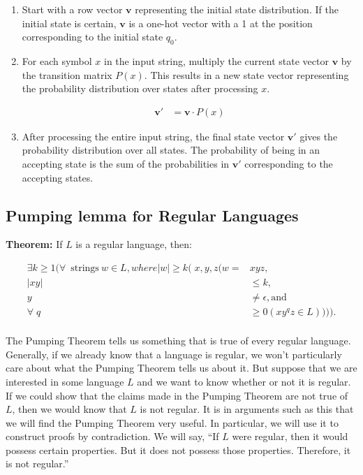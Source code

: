 \documentclass[hidelinks,12pt]{article}
\begin{document}
\begin{enumerate}
  \item  Start with a row vector $\mathbf{v}$ representing the initial state distribution. If the initial state is certain, $\mathbf{v}$ is a one-hot vector with a 1 at the position corresponding to the initial state $q_0$.

  \item  For each symbol $x$ in the input string, multiply the current state vector $\mathbf{v}$ by the transition matrix $P(x)$. This results in a new state vector representing the probability distribution over states after processing $x$.

  \begin{align*}
		  \mathbf{v}' &= \mathbf{v} \cdot P(x)
  \end{align*}

  \item  After processing the entire input string, the final state vector $\mathbf{v}'$ gives the probability distribution over all states. The probability of being in an accepting state is the sum of the probabilities in $\mathbf{v}'$ corresponding to the accepting states.

\end{enumerate}


\subsection{Pumping lemma for Regular Languages }

\textbf{Theorem:} If $L$ is a regular language, then: 

\begin{align*}
		\exists k \ge 1 ( \forall \>\text{strings} \> w \in L, where |w| \ge k (x, y, z (w = &xyz, \\
		 |xy| &\le k, \\
		 y &\ne \epsilon, \text{and} \\
		\forallq &\ge 0 (xy^{q}z \in L)))). \\
\end{align*}
 
The Pumping Theorem tells us something that is true of every regular language.
Generally, if we already know that a language is regular, we won’t particularly
care about what the Pumping Theorem tells us about it. But suppose that we are
interested in some language $L$ and we want to know whether or not it is
regular. If we could show that the claims made in the Pumping Theorem are not
true of $L$, then we would know that $L$ is not regular. It is in arguments
such as this that we will find the Pumping Theorem very useful. In particular,
we will use it to construct proofs by contradiction. We will say, “If $L$ were
regular, then it would possess certain properties. But it does not possess
those properties. Therefore, it is not regular.”
\end{document}
